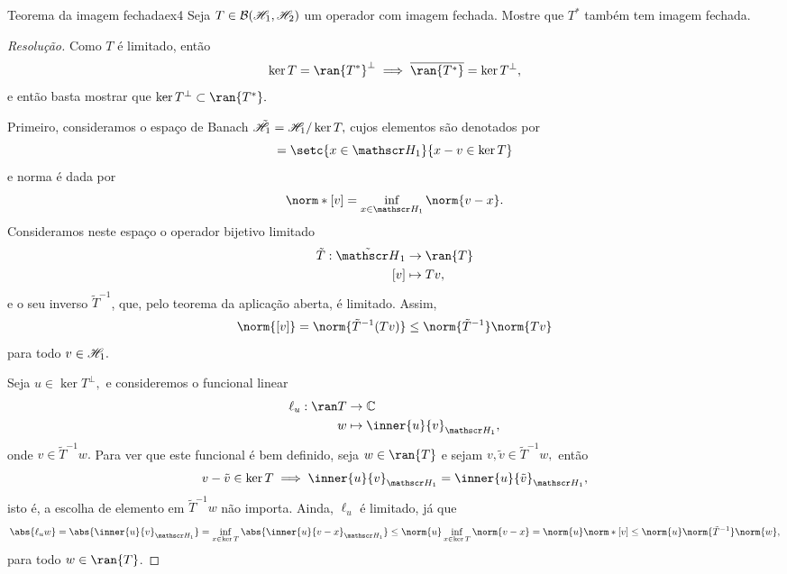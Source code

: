 \begin{exercício}{Teorema da imagem fechada}{ex4}
  Seja \(T \in \mathcal{B}(\mathscr{H}_1, \mathscr{H}_2)\) um operador com imagem fechada. Mostre que \(T^*\) também tem imagem fechada.
\end{exercício}
\begin{proof}[Resolução]
  Como \(T\) é limitado, então
  \begin{equation*}
    \ker{T} = \ran{T^*}^\perp \implies \closure{\ran{T^*}} = \ker{T}^\perp,
  \end{equation*}
  e então basta mostrar que \(\ker{T}^\perp \subset \ran{T^*}.\)

  Primeiro, consideramos o espaço de Banach \(\tilde{\mathscr{H}}_1 = \mathscr{H}_1 / \ker{T},\) cujos elementos são denotados por
  \begin{equation*}
    [v] = \setc{x \in \hilbert_1}{x - v \in \ker{T}}
  \end{equation*}
  e norma é dada por
  \begin{equation*}
    \norm*{[v]} = \inf_{x \in \hilbert_1}{\norm{v - x}}.
  \end{equation*}
  Consideramos neste espaço o operador bijetivo limitado
  \begin{align*}
    \tilde{T} : \tilde{\hilbert}_1 &\to \ran{T}\\
                               [v] &\mapsto Tv,
  \end{align*}
  e o seu inverso \(\tilde{T}^{-1}\), que, pelo teorema da aplicação aberta, é limitado. Assim,
  \begin{equation*}
    \norm{[v]} = \norm{\tilde{T}^{-1}(Tv)} \leq \norm{\tilde{T}^{-1}} \norm{Tv}
  \end{equation*}
  para todo \(v \in \mathscr{H}_1.\)

  Seja \(u \in \ker{T}^\perp,\) e consideremos o funcional linear
  \begin{align*}
    \ell_u : \ran T &\to \mathbb{C}\\
                  w &\mapsto \inner{u}{v}_{\hilbert_1},
  \end{align*}
  onde \(v \in \tilde{T}^{-1}w.\)
  Para ver que este funcional é bem definido, seja \(w \in \ran{T}\) e sejam \(v, \tilde{v} \in \tilde{T}^{-1}w,\) então
  \begin{equation*}
    v - \tilde{v} \in \ker{T} \implies \inner{u}{v}_{\hilbert_1} = \inner{u}{\tilde{v}}_{\hilbert_1},
  \end{equation*}
  isto é, a escolha de elemento em \(\tilde{T}^{-1}w\) não importa. Ainda, \(\ell_u\) é limitado, já que
  \begin{equation*}
    \abs{\ell_uw} = \abs{\inner{u}{v}_{\hilbert_1}} = \inf_{x \in \ker{T}}{\abs{\inner{u}{v - x}_{\hilbert_1}}} \leq \norm{u}\inf_{x \in \ker{T}}{\norm{v - x}} = \norm{u} \norm*{[v]} \leq \norm{u} \norm{\tilde{T}^{-1}} \norm{w},
  \end{equation*}
  para todo \(w \in \ran{T}\).


\end{proof}
